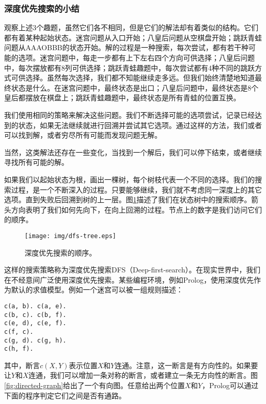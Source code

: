 \documentclass[UTF8]{article}
\begin{document}
\subsubsection{深度优先搜索的小结}

观察上述3个趣题，虽然它们各不相同，但是它们的解法却有着类似的结构。它们都有着某种起始状态。迷宫问题从入口开始；八皇后问题从空棋盘开始；跳跃青蛙问题从AAAOBBB的状态开始。解的过程是一种搜索，每次尝试，都有若干种可能的选项。迷宫问题中，每走一步都有上下左右四个方向可供选择；八皇后问题中，每次摆放都有8列可供选择；跳跃青蛙趣题中，每次尝试都有4种不同的跳跃方式可供选择。虽然每次选择，我们都不知能继续走多远。但我们始终清楚地知道最终状态是什么。在迷宫问题中，最终状态是出口；八皇后问题中，最终状态是8个皇后都摆放在棋盘上；跳跃青蛙趣题中，最终状态是所有青蛙的位置互换。

我们使用相同的策略来解决这些问题。我们不断选择可能的选项尝试，记录已经达到的状态，如果无法继续就进行回溯并尝试其它选项。通过这样的方法，我们或者可以找到解，或者穷尽所有可能而发现问题无解。

当然，这类解法还存在一些变化，当找到一个解后，我们可以停下结束，或者继续寻找所有可能的解。

如果我们以起始状态为根，画出一棵树，每个树枝代表一个不同的选择。我们的搜索过程，是一个不断深入的过程。只要能够继续，我们就不考虑同一深度上的其它选项。直到失败后回溯到树的上一层。图\ref{fig:dfs-tree}描述了我们在状态树中的搜索顺序。箭头方向表明了我们如何先向下，在向上回溯的过程。节点上的数字是我们访问它们的顺序。

\begin{figure}[htbp]
 \centering
 \texttt{[image: img/dfs-tree.eps]}
 \caption{深度优先搜索的顺序。}
 \label{fig:dfs-tree}
\end{figure}

这样的搜索策略称为深度优先搜索DFS（Deep-first-search）。在现实世界中，我们在不经意间广泛使用深度优先搜索。某些编程环境，例如Prolog，使用深度优先作为默认的求值模型。例如一个迷宫可以被一组规则描述：

\lstset{language=Prolog}
\begin{lstlisting}
c(a, b). c(a, e).
c(b, c). c(b, f).
c(e, d), c(e, f).
c(f, c).
c(g, d). c(g, h).
c(h, f).
\end{lstlisting}

其中，断言$c(X, Y)$表示位置$X$和$Y$连通。注意，这一断言是有方向性的。如果要让$Y$和$X$连通，我们可以增加一条对称的断言，或者建立一条无方向性的断言。图\ref{fig:directed-graph}给出了一个有向图。任意给出两个位置$X$和$Y$，Prolog可以通过下面的程序判定它们之间是否有通路。
\end{document}
